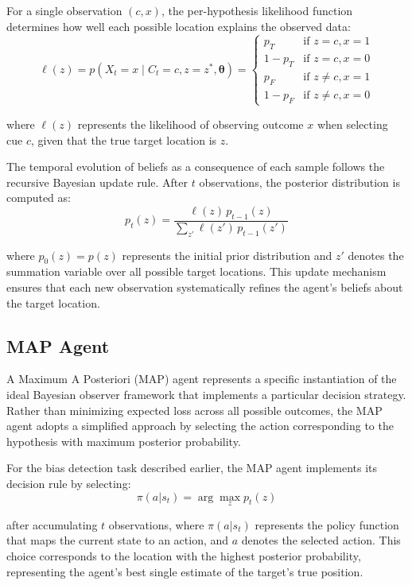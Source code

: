 \documentclass{article}
\begin{document}
For a single observation $(c, x)$, the per-hypothesis likelihood function determines how well each possible location explains the observed data:
\begin{equation}
\ell(z) = p(X_t = x \mid C_t = c, z = z^*, \boldsymbol{\theta}) = \begin{cases}
p_T & \text{if } z = c, x = 1 \\
1 - p_T & \text{if } z = c, x = 0 \\
p_F & \text{if } z \neq c, x = 1 \\
1 - p_F & \text{if } z \neq c, x = 0
\end{cases}
\end{equation}

where $\ell(z)$ represents the likelihood of observing outcome $x$ when selecting cue $c$, given that the true target location is $z$.

The temporal evolution of beliefs as a consequence of each sample follows the recursive Bayesian update rule. After $t$ observations, the posterior distribution is computed as:
\begin{equation}
p_t(z) = \frac{\ell(z) \, p_{t-1}(z)}{\sum_{z'} \ell(z') \, p_{t-1}(z')}
\end{equation}

where $p_0(z) = p(z)$ represents the initial prior distribution and $z'$ denotes the summation variable over all possible target locations. This update mechanism ensures that each new observation systematically refines the agent's beliefs about the target location.

\subsection{MAP Agent}

A Maximum A Posteriori (MAP) agent represents a specific instantiation of the ideal Bayesian observer framework that implements a particular decision strategy. Rather than minimizing expected loss across all possible outcomes, the MAP agent adopts a simplified approach by selecting the action corresponding to the hypothesis with maximum posterior probability.

For the bias detection task described earlier, the MAP agent implements its decision rule by selecting:
\begin{equation}
\pi(a|s_t) = \arg\max_z p_t(z)
\end{equation}

after accumulating $t$ observations, where $\pi(a|s_t)$ represents the policy function that maps the current state to an action, and $a$ denotes the selected action. This choice corresponds to the location with the highest posterior probability, representing the agent's best single estimate of the target's true position.
\end{document}
